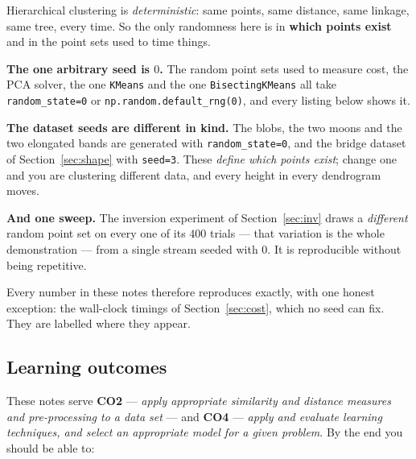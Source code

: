 \documentclass[11pt]{article}
\begin{document}
\begin{keyidea}
Hierarchical clustering is \emph{deterministic}: same points, same distance,
same linkage, same tree, every time. So the only randomness here is in
\textbf{which points exist} and in the point sets used to time things.

\textbf{The one arbitrary seed is $0$.} The random point sets used to measure
cost, the PCA solver, the one \texttt{KMeans} and the one
\texttt{BisectingKMeans} all take \texttt{random\_state=0} or
\texttt{np.random.default\_rng(0)}, and every listing below shows it.

\textbf{The dataset seeds are different in kind.} The blobs, the two moons and
the two elongated bands are generated with \texttt{random\_state=0}, and the
bridge dataset of Section~\ref{sec:shape} with \texttt{seed=3}. These
\emph{define which points exist}; change one and you are clustering different
data, and every height in every dendrogram moves.

\textbf{And one sweep.} The inversion experiment of Section~\ref{sec:inv}
draws a \emph{different} random point set on every one of its $400$ trials ---
that variation is the whole demonstration --- from a single stream seeded
with $0$. It is reproducible without being repetitive.

Every number in these notes therefore reproduces exactly, with one honest
exception: the wall-clock timings of Section~\ref{sec:cost}, which no seed can
fix. They are labelled where they appear.
\end{keyidea}

\subsection{Learning outcomes}

These notes serve \textbf{CO2} --- \emph{apply appropriate similarity and
distance measures and pre-processing to a data set} --- and \textbf{CO4} ---
\emph{apply and evaluate learning techniques, and select an appropriate model
for a given problem}. By the end you should be able to:
\end{document}
